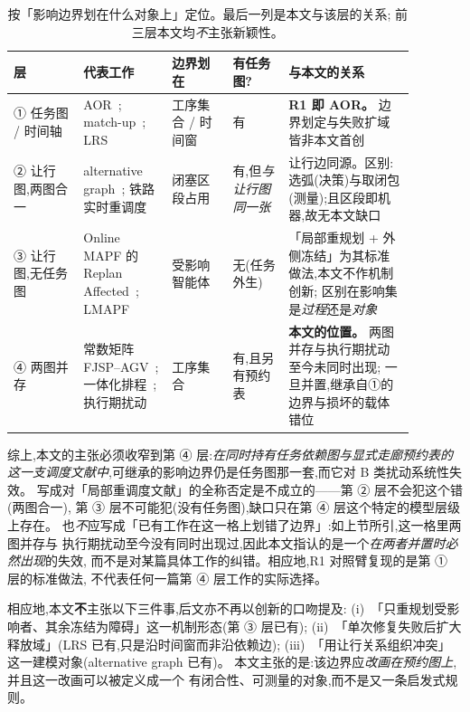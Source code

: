 \documentclass[manuscript,screen,review]{acmart}
\begin{document}
\begin{table}[t]
\centering
\caption{按「影响边界划在什么对象上」定位。最后一列是本文与该层的关系;
前三层本文均\emph{不}主张新颖性。}
\label{tab:position}
\small
\begin{tabular}{@{}p{0.155\linewidth}p{0.195\linewidth}p{0.135\linewidth}p{0.125\linewidth}p{0.275\linewidth}@{}}
\toprule
\textbf{层} & \textbf{代表工作} & \textbf{边界划在} & \textbf{有任务图?} & \textbf{与本文的关系} \\
\midrule
① 任务图 / 时间轴 &
AOR~\cite{li1993heuristic,abumaizar1997rescheduling,subramaniam2003maor};
match-up~\cite{bean1991matchup,akturk1999matchup}; LRS~\cite{kuster2007local} &
工序集合 / 时间窗 & 有 &
\textbf{R1 即 AOR。} 边界划定与失败扩域皆非本文首创 \\
\addlinespace[2pt]
② 让行图,两图合一 &
alternative graph~\cite{mascis2002alternative}; 铁路实时重调度~\cite{dariano2007branch} &
闭塞区段占用 & 有,但\emph{与让行图同一张} &
让行边同源。区别:选弧(决策)与取闭包(测量);且区段即机器,故无本文缺口 \\
\addlinespace[2pt]
③ 让行图,无任务图 &
Online MAPF 的 Replan Affected~\cite{svancara2019online,malka2024online};
LMAPF~\cite{zhang2024guidance} &
受影响智能体 & 无(任务外生) &
「局部重规划 + 外侧冻结」为其标准做法,本文不作机制创新;
区别在影响集是\emph{过程}还是\emph{对象} \\
\addlinespace[2pt]
④ 两图并存 &
常数矩阵 FJSP--AGV~\cite{xin2025review,meng2025cp,qin2026knowledge,fu2025integrated};
一体化排程~\cite{vanos2026exact,sun2023integrated,li2026framework};
执行期扰动~\cite{zhang2023energy,tang2026dynamic} &
工序集合 & 有,且另有预约表 &
\textbf{本文的位置。} 两图并存与执行期扰动至今未同时出现;
一旦并置,继承自①的边界与损坏的载体错位 \\
\bottomrule
\end{tabular}
\end{table}

综上,本文的主张必须收窄到第 ④ 层:\emph{在同时持有任务依赖图与显式走廊预约表的
这一支调度文献中},可继承的影响边界仍是任务图那一套,而它对 B 类扰动系统性失效。
写成对「局部重调度文献」的全称否定是不成立的——第 ② 层不会犯这个错(两图合一),
第 ③ 层不可能犯(没有任务图),缺口只在第 ④ 层这个特定的模型层级上存在。
也\emph{不}应写成「已有工作在这一格上划错了边界」:如上节所引,这一格里两图并存与
执行期扰动至今没有同时出现过,因此本文指认的是一个\emph{在两者并置时必然出现}的失效,
而不是对某篇具体工作的纠错。相应地,R1 对照臂复现的是第 ① 层的标准做法,
不代表任何一篇第 ④ 层工作的实际选择。

相应地,本文\textbf{不}主张以下三件事,后文亦不再以创新的口吻提及:
(i)~「只重规划受影响者、其余冻结为障碍」这一机制形态(第 ③ 层已有);
(ii)~「单次修复失败后扩大释放域」(LRS 已有,只是沿时间窗而非沿依赖边);
(iii)~「用让行关系组织冲突」这一建模对象(alternative graph 已有)。
本文主张的是:该边界应\emph{改画在预约图上},并且这一改画可以被定义成一个
有闭合性、可测量的对象,而不是又一条启发式规则。
\end{document}
